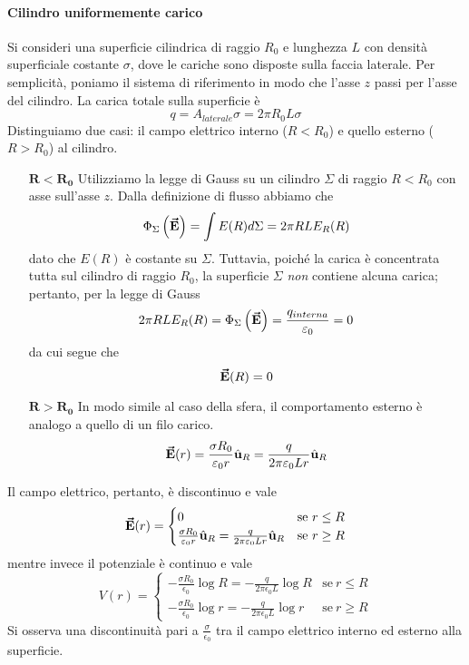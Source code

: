 \paragraph{Cilindro uniformemente carico}
Si consideri una superficie cilindrica di raggio $R_0$ e lunghezza $L$ con densità superficiale costante $\sigma$, dove le cariche sono disposte sulla faccia laterale. Per semplicità, poniamo il sistema di riferimento in modo che l'asse $z$ passi per l'asse del cilindro.
La carica totale sulla superficie è
\begin{equation}
	q=A_{laterale} \sigma=2\pi R_0 L \sigma
\end{equation}
Distinguiamo due casi: il campo elettrico interno ($R<R_0$) e quello esterno ($R>R_0$) al cilindro.
\begin{itemize}
	\item[$\mathbf{R<R_0}$] Utilizziamo la legge di Gauss su un cilindro $\Sigma$ di raggio $R<R_0$ con asse sull'asse $z$. Dalla definizione di flusso abbiamo che
	\begin{equation*}
		\Phi_{\Sigma}\left(\vb*{\va{E}}\right)=\int E(R)d\Sigma=2\pi R L E_R(R)
	\end{equation*}
	dato che $E(R)$ è costante su $\Sigma$.
	Tuttavia, poiché la carica è concentrata tutta sul cilindro di raggio $R_0$, la superficie $\Sigma$ \textit{non} contiene alcuna carica; pertanto, per la legge di Gauss
	\begin{equation*}
		2\pi R L E_R(R)=\Phi_{\Sigma}\left(\vb*{\va{E}}\right)=\frac{q_{interna}}{\varepsilon_0}=0
	\end{equation*}
	da cui segue che
	\begin{equation}
		\vb*{\va{E}}(R)=0
	\end{equation}
	\item[$\mathbf{R>R_0}$] In modo simile al caso della sfera, il comportamento esterno è analogo a quello di un filo carico. %
	\begin{equation}
		\vb*{\va{E}}(r)=\frac{\sigma R_0}{\varepsilon_0r}\hat{\mathbf{u}}_R=\frac{q}{2\pi\varepsilon_0Lr}\hat{\mathbf{u}}_R
	\end{equation}
\end{itemize}
Il campo elettrico, pertanto, è discontinuo e vale
\begin{equation}
	\vb*{\va{E}}(r)=\begin{cases}
		0&\text{se}\ r\leq R\\
		\frac{\sigma R_0}{\varepsilon_0r}\hat{\mathbf{u}}_R=\frac{q}{2\pi\varepsilon_0Lr}\hat{\mathbf{u}}_R &\text{se}\ r\geq R
	\end{cases}
\end{equation}
mentre invece il potenziale è continuo e vale
\begin{equation}
	V(r)=
	\begin{cases}
		-\frac{\sigma R_0}{\epsilon_0}\log R=-\frac{q}{2\pi\epsilon_0L}\log R&\text{se}\ r\leq R\\
		-\frac{\sigma R_0}{\epsilon_0}\log r=-\frac{q}{2\pi\epsilon_0L}\log r&\text{se}\ r\geq R
	\end{cases}
\end{equation}
Si osserva una discontinuità pari a $\frac{\sigma}{\epsilon_0}$ tra il campo elettrico interno ed esterno alla superficie.
